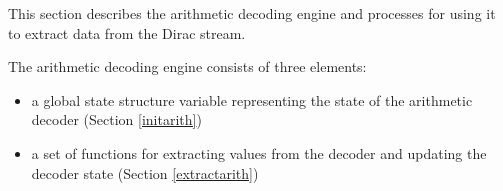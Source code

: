 This section describes the arithmetic decoding engine and
processes for using it to extract data from the Dirac stream.

The arithmetic decoding engine consists of three elements: 

\begin{itemize}
\item a global state
structure variable  \ArithState representing the state of the arithmetic 
decoder (Section \ref{initarith})
\item a set of functions for extracting values from the decoder 
and updating the decoder state (Section \ref{extractarith})
\end{itemize}
